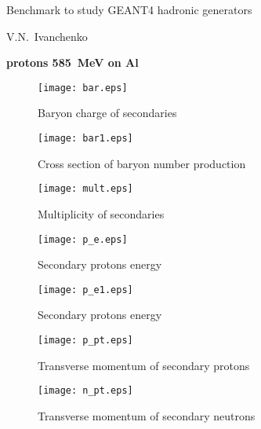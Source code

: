 \documentclass[12pt]{article}
\begin{document}
\pagestyle{empty}

\begin{center}
{\large Benchmark to study GEANT4 hadronic generators} 

\vspace*{5mm}
V.N.~Ivanchenko

\vspace*{5mm}


\vspace*{5mm}

{\bf protons 585~MeV on Al} 

\vspace*{5mm}


\end{center}


\begin{figure}[htbp]
\caption{Baryon charge of secondaries}
\label{fig1}  
\centerline{\texttt{[image: bar.eps]}}
\end{figure}

\begin{figure}[htbp]
\caption{Cross section of baryon number production}
\label{fig1b}  
\centerline{\texttt{[image: bar1.eps]}}
\end{figure}


\begin{figure}[htbp]
\caption{Multiplicity of secondaries}
\label{fig1a}  
\centerline{\texttt{[image: mult.eps]}}
\end{figure}
\begin{figure}[htbp]
\caption{Secondary protons energy}
\label{fig2} 
\centerline{\texttt{[image: p\_e.eps]}}
\end{figure}
\begin{figure}[htbp]
\caption{Secondary protons energy}
\label{fig2a} 
\centerline{\texttt{[image: p\_e1.eps]}}
\end{figure}

\newpage

\begin{figure}[htbp]
\caption{Transverse momentum of secondary protons} 
\label{fig3}
\centerline{\texttt{[image: p\_pt.eps]}}
\end{figure}

\newpage

\begin{figure}[htbp]
\caption{Transverse momentum of secondary neutrons} 
\label{fig4}
\centerline{\texttt{[image: n\_pt.eps]}}
\end{figure}
\end{document}
